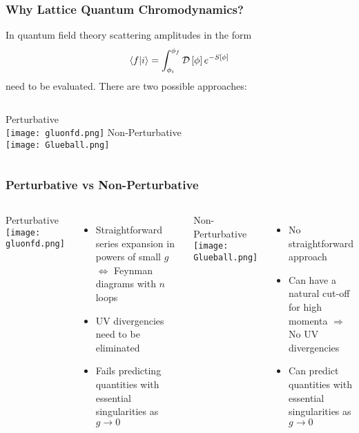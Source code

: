 \documentclass{beamer}
\begin{document}
\begin{frame}
  \titlepage
\end{frame}

\begin{frame}
  \frametitle{Why Lattice Quantum Chromodynamics?}
  \centering
  In quantum field theory scattering amplitudes in the form
  \begin{equation*}
    \bra{f}\ket{i} = \int_{\phi_i}^{\phi_f}\mathcal{D}\left[\phi\right] e^{-S[\phi]}
  \end{equation*}
  need to be evaluated.
  There are two possible approaches:
  \vspace{\baselineskip}
  \begin{columns}[t]
    \centering
    Perturbative\\
    \vspace{\baselineskip}
    \texttt{[image: gluonfd.png]}
    \centering
    Non-Perturbative\\
    \vspace{\baselineskip}
    \texttt{[image: Glueball.png]}
  \end{columns}
\end{frame}

\begin{frame}
  \frametitle{Perturbative vs Non-Perturbative}
  \centering
  \begin{columns}[t]
    \centering
{}
    Perturbative\\
    \vspace{0.5\baselineskip}
    \texttt{[image: gluonfd.png]}\\
    \vspace{0.5\baselineskip}
    \begin{itemize}
     \item Straightforward series expansion in powers of small $g$ $\Leftrightarrow$ Feynman diagrams with $n$ loops
     \item UV divergencies need to be eliminated
     \item Fails predicting quantities with essential singularities as $g\rightarrow0$
    \end{itemize}
    \centering
{}
    Non-Perturbative\\
    \vspace{0.5\baselineskip}
    \texttt{[image: Glueball.png]}\\
    \vspace{0.5\baselineskip}
    \begin{itemize}
     \item No straightforward approach
     \item Can have a natural cut-off for high momenta $\Rightarrow$ No UV divergencies
     \item Can predict quantities with essential singularities as $g\rightarrow0$
    \end{itemize}
  \end{columns}
\end{frame}
\end{document}
